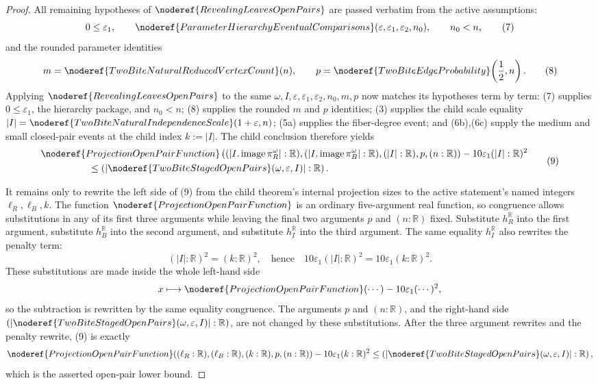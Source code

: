 \begin{proof}
All remaining hypotheses of \(\noderef{RevealingLeavesOpenPairs}\) are passed
verbatim from the active assumptions:
\[
0\le\varepsilon_1,\qquad
\noderef{ParameterHierarchyEventualComparisons}
(\varepsilon,\varepsilon_1,\varepsilon_2,n_0),\qquad n_0<n,
\tag{7}
\]
and the rounded parameter identities
\[
m=\noderef{TwoBiteNaturalReducedVertexCount}(n),\qquad
p=\noderef{TwoBiteEdgeProbability}\!\left(\frac12,n\right).
\tag{8}
\]
Applying \(\noderef{RevealingLeavesOpenPairs}\) to the same
\(\omega,I,\varepsilon,\varepsilon_1,\varepsilon_2,n_0,m,p\) now matches its
hypotheses term by term: (7) supplies \(0\le\varepsilon_1\), the hierarchy
package, and \(n_0<n\); (8) supplies the rounded \(m\) and \(p\) identities;
(3) supplies the child scale equality \( |I|=\noderef{TwoBiteNaturalIndependenceScale}(1+\varepsilon,n)\);
(5a) supplies the fiber-degree event; and (6b),(6c) supply the medium and
small closed-pair events at the child index \(k:=|I|\).  The child conclusion
therefore yields
\[
\begin{aligned}
&\noderef{ProjectionOpenPairFunction}
 \left((|I.\operatorname{image}\pi_R^\omega|:\mathbb R),
       (|I.\operatorname{image}\pi_B^\omega|:\mathbb R),
       (|I|:\mathbb R),p,(n:\mathbb R)\right)
 -10\varepsilon_1 (|I|:\mathbb R)^2  \\
&\hspace{5em}\le
\left(\left|
\noderef{TwoBiteStagedOpenPairs}(\omega,\varepsilon,I)
\right|:\mathbb R\right).
\end{aligned}
\tag{9}
\]

It remains only to rewrite the left side of (9) from the child theorem's
internal projection sizes to the active statement's named integers
\(\ell_R,\ell_B,k\).  The function
\(\noderef{ProjectionOpenPairFunction}\) is an ordinary five-argument real
function, so congruence allows substitutions in any of its first three
arguments while leaving the final two arguments \(p\) and \((n:\mathbb R)\)
fixed.  Substitute \(h_R^{\mathbb R}\) into the first argument, substitute
\(h_B^{\mathbb R}\) into the second argument, and substitute
\(h_I^{\mathbb R}\) into the third argument.  The same equality
\(h_I^{\mathbb R}\) also rewrites the penalty term:
\[
(|I|:\mathbb R)^2=(k:\mathbb R)^2,
\quad\text{hence}\quad
10\varepsilon_1(|I|:\mathbb R)^2
  =10\varepsilon_1(k:\mathbb R)^2.
\tag{10}
\]
These substitutions are made inside the whole left-hand side
\[
x\longmapsto
\noderef{ProjectionOpenPairFunction}(\cdots)-10\varepsilon_1(\cdots)^2,
\]
so the subtraction is rewritten by the same equality congruence.  The
arguments \(p\) and \((n:\mathbb R)\), and the right-hand side
\(\left(|\noderef{TwoBiteStagedOpenPairs}(\omega,\varepsilon,I)|:\mathbb R\right)\),
are not changed by these substitutions.  After the three argument rewrites and
the penalty rewrite, (9) is exactly
\[
\noderef{ProjectionOpenPairFunction}
  ((\ell_R:\mathbb R),(\ell_B:\mathbb R),(k:\mathbb R),p,(n:\mathbb R))
  -10\varepsilon_1 (k:\mathbb R)^2
\le
\left(\left|
\noderef{TwoBiteStagedOpenPairs}(\omega,\varepsilon,I)
\right|:\mathbb R\right),
\]
which is the asserted open-pair lower bound.
\end{proof}
